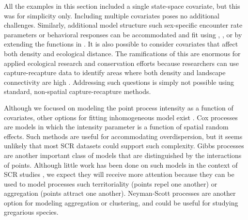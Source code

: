 All the examples in this section included a single state-space
covariate, but this was for simplicity only. Including multiple
covariates poses no additional challenges. Similarly, additional model
structure such sex-specific encounter rate parameters or behavioral
responses can be accommodated and fit using \secr, \bugs, or by
extending the functions in \scrbook. It is also possible to consider
covariates that affect both density and ecological
distance. The ramifications of this are enormous for applied
ecological research and conservation efforts because %
researchers can use capture-recapture data to identify areas where
both density and landscape connectivity are high
\citep{royle_etal:2012ecol}. Addressing such questions
is simply not possible using standard, non-spatial capture-recapture
methods. %


Although we focused on modeling the point process intensity as a
function of covariates, other options for fitting inhomogeneous model
exist \citet{illian_etal:2008}. Cox processes are  models in which the
intensity parameter is a function of spatial random effects. Such
methods are useful for accommodating overdispersion, but it seems unlikely that
most SCR datasets could support such complexity. Gibbs processes
are another important class of models that are distinguished by the
interactions of points. Although little work has been done on such
models in the context of SCR studies \citep{reich_etal:2012}, we
expect they will receive more
attention because they can be used to model processes such
territoriality (points repel one another) or aggregation (points
attract one another). Neyman-Scott processes are another option for
modeling aggregation or clustering, and could be useful for studying
gregarious species.

